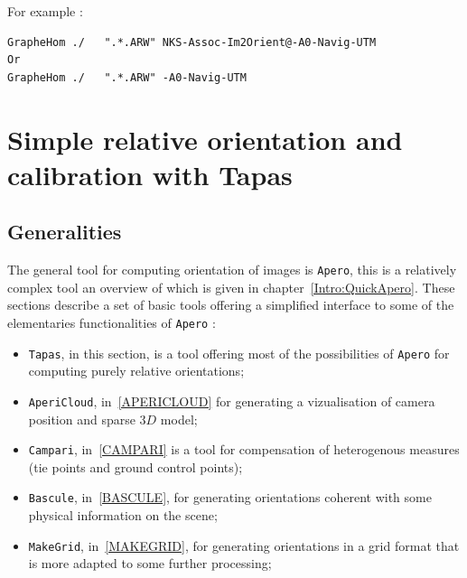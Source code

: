For example :

\begin{verbatim}
GrapheHom ./   ".*.ARW" NKS-Assoc-Im2Orient@-A0-Navig-UTM
Or 
GrapheHom ./   ".*.ARW" -A0-Navig-UTM
\end{verbatim}





\section{Simple relative orientation and calibration with Tapas}

\label{Tapas}


\subsection{Generalities}

The general tool for computing orientation of images is {\tt Apero},
this is a relatively complex tool an overview of which is given in chapter~\ref{Intro:QuickApero}.
These sections describe a set of basic tools offering a simplified interface
to some of the elementaries functionalities of {\tt Apero} :

\begin{itemize}
   \item {\tt Tapas}, in this section, is a tool offering most of the possibilities
         of {\tt Apero} for computing purely relative orientations;

   \item {\tt AperiCloud}, in~\ref{APERICLOUD} for generating a vizualisation of camera
         position and sparse $3D$ model;
		 
   \item {\tt Campari}, in~\ref{CAMPARI} is a tool for compensation of heterogenous measures (tie points and ground control points);

   \item {\tt Bascule}, in~\ref{BASCULE}, for generating orientations coherent with
        some physical information on the scene;

   \item {\tt MakeGrid}, in~\ref{MAKEGRID}, for generating   orientations  in a grid
         format that is more adapted to some further processing;

\end{itemize}

